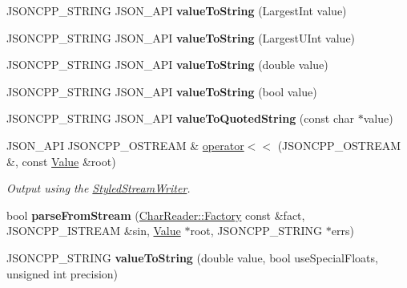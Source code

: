 \begin{DoxyCompactItemize}
\item 
J\+S\+O\+N\+C\+P\+P\+\_\+\+S\+T\+R\+I\+NG J\+S\+O\+N\+\_\+\+A\+PI {\bfseries value\+To\+String} (Largest\+Int value)\hypertarget{namespaceJson_a4732517cb28d203cfd4354d05952a81b}{}\label{namespaceJson_a4732517cb28d203cfd4354d05952a81b}

\item 
J\+S\+O\+N\+C\+P\+P\+\_\+\+S\+T\+R\+I\+NG J\+S\+O\+N\+\_\+\+A\+PI {\bfseries value\+To\+String} (Largest\+U\+Int value)\hypertarget{namespaceJson_a6283ea3db02efe9104ae6baff698245a}{}\label{namespaceJson_a6283ea3db02efe9104ae6baff698245a}

\item 
J\+S\+O\+N\+C\+P\+P\+\_\+\+S\+T\+R\+I\+NG J\+S\+O\+N\+\_\+\+A\+PI {\bfseries value\+To\+String} (double value)\hypertarget{namespaceJson_a3cf0c8dbbdb898c4a6fad54670b34bd1}{}\label{namespaceJson_a3cf0c8dbbdb898c4a6fad54670b34bd1}

\item 
J\+S\+O\+N\+C\+P\+P\+\_\+\+S\+T\+R\+I\+NG J\+S\+O\+N\+\_\+\+A\+PI {\bfseries value\+To\+String} (bool value)\hypertarget{namespaceJson_a0a706a1fffba4fe8a8c1ef75b2dbbfab}{}\label{namespaceJson_a0a706a1fffba4fe8a8c1ef75b2dbbfab}

\item 
J\+S\+O\+N\+C\+P\+P\+\_\+\+S\+T\+R\+I\+NG J\+S\+O\+N\+\_\+\+A\+PI {\bfseries value\+To\+Quoted\+String} (const char $\ast$value)\hypertarget{namespaceJson_aaf777a6923bcb4cf63a2729973fe5315}{}\label{namespaceJson_aaf777a6923bcb4cf63a2729973fe5315}

\item 
J\+S\+O\+N\+\_\+\+A\+PI J\+S\+O\+N\+C\+P\+P\+\_\+\+O\+S\+T\+R\+E\+AM \& \hyperlink{namespaceJson_a975d1dbca8aa7a06f38d373edcb9081c}{operator$<$$<$} (J\+S\+O\+N\+C\+P\+P\+\_\+\+O\+S\+T\+R\+E\+AM \&, const \hyperlink{classJson_1_1Value}{Value} \&root)
\begin{DoxyCompactList}\small\item\em Output using the \hyperlink{classJson_1_1StyledStreamWriter}{Styled\+Stream\+Writer}. \end{DoxyCompactList}\item 
bool {\bfseries parse\+From\+Stream} (\hyperlink{classJson_1_1CharReader_1_1Factory}{Char\+Reader\+::\+Factory} const \&fact, J\+S\+O\+N\+C\+P\+P\+\_\+\+I\+S\+T\+R\+E\+AM \&sin, \hyperlink{classJson_1_1Value}{Value} $\ast$root, J\+S\+O\+N\+C\+P\+P\+\_\+\+S\+T\+R\+I\+NG $\ast$errs)\hypertarget{namespaceJson_a38f903cfdb57a6c4e86a7dcc42f3712c}{}\label{namespaceJson_a38f903cfdb57a6c4e86a7dcc42f3712c}

\item 
J\+S\+O\+N\+C\+P\+P\+\_\+\+S\+T\+R\+I\+NG {\bfseries value\+To\+String} (double value, bool use\+Special\+Floats, unsigned int precision)\hypertarget{namespaceJson_a41f0a9fca69a534a8646ce0123683a8b}{}\label{namespaceJson_a41f0a9fca69a534a8646ce0123683a8b}

\end{DoxyCompactItemize}

